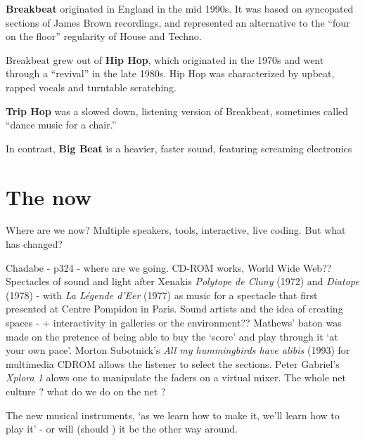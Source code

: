 \textbf{Breakbeat} originated in England in the mid 1990s. It was based on syncopated sections of James Brown recordings, and represented an alternative to the ``four on the floor'' regularity of House and Techno.

Breakbeat grew out of \textbf{Hip Hop}, which originated in the 1970s and went through a ``revival'' in the late 1980s. Hip Hop was characterized by upbeat, rapped vocals and turntable scratching.

\textbf{Trip Hop} was a slowed down, listening version of Breakbeat, sometimes called ``dance music for a chair.''

In contrast, \textbf{Big Beat} is a heavier, faster sound, featuring screaming electronics

\section{The now}

Where are we now? Multiple speakers, tools, interactive, live coding. 
But what has changed?

Chadabe - p324 - where are we going.  CD-ROM works, World Wide Web??  Spectacles of sound and light after Xenakis \textit{Polytope de Cluny} (1972) and \textit{Diatope} (1978) - with \textit{La Légende d'Eer} (1977) as music for a spectacle that first presented at Centre Pompidou in Paris.  Sound artists and the idea of creating spaces - + interactivity in galleries or the environment??  Mathews' baton was made on the pretence of being able to buy the `score' and play through it `at your own pace'.  Morton Subotnick's \textit{All my hummingbirds have alibis} (1993) for multimedia CDROM allows the listener to select the sections.  Peter Gabriel's \textit{Xplora 1} alows one to manipulate the faders on a virtual mixer.  The whole net culture ? what do we do on the net ?

The new musical instruments, `as we learn how to make it, we'll learn how to play it' - or will (should ) it be the other way around.








